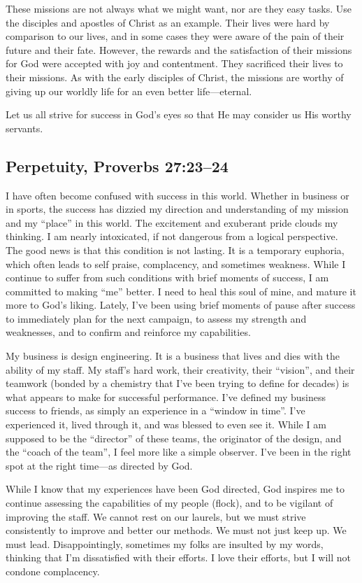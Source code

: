 \documentclass[12pt]{memoir}
\begin{document}
These missions are not always what we might want, nor are they easy
tasks. Use the disciples and apostles of Christ as an example. Their
lives were hard by comparison to our lives, and in some cases they
were aware of the pain of their future and their fate. However, the
rewards and the satisfaction of their missions for God were accepted
with joy and contentment. They sacrificed their lives to their missions.
As with the early disciples of Christ, the missions are worthy of
giving up our worldly life for an even better life---eternal.

Let us all strive for success in God's eyes so that He may consider
us His worthy servants.

\subsection{Perpetuity, Proverbs 27:23--24}

I have often become confused with success in this world. Whether in
business or in sports, the success has dizzied my direction and understanding
of my mission and my ``place'' in this world. The excitement and
exuberant pride clouds my thinking. I am nearly intoxicated, if not
dangerous from a logical perspective. The good news is that this condition
is not lasting. It is a temporary euphoria, which often leads to self
praise, complacency, and sometimes weakness. While I continue to suffer
from such conditions with brief moments of success, I am committed
to making ``me'' better. I need to heal this soul of mine, and mature
it more to God's liking. Lately, I've been using brief moments of
pause after success to immediately plan for the next campaign, to
assess my strength and weaknesses, and to confirm and reinforce my
capabilities.

My business is design engineering. It is a business that lives and
dies with the ability of my staff. My staff's hard work, their creativity,
their ``vision'', and their teamwork (bonded by a chemistry that
I've been trying to define for decades) is what appears to make for
successful performance. I've defined my business success to friends,
as simply an experience in a ``window in time''. I've experienced
it, lived through it, and was blessed to even see it. While I am supposed
to be the ``director'' of these teams, the originator of the design,
and the ``coach of the team'', I feel more like a simple observer.
I've been in the right spot at the right time---as directed by God.

While I know that my experiences have been God directed, God inspires
me to continue assessing the capabilities of my people (flock), and
to be vigilant of improving the staff. We cannot rest on our laurels,
but we must strive consistently to improve and better our methods.
We must not just keep up. We must lead. Disappointingly, sometimes
my folks are insulted by my words, thinking that I'm dissatisfied
with their efforts. I love their efforts, but I will not condone complacency. 
\end{document}
